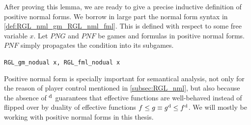 After proving this lemma, we are ready to give a precise inductive definition of positive normal forms. We borrow in large part the normal form syntax in \autoref{def:RGL_nml_gm_RGL_nml_fml}. This is defined with respect to some free variable $x$. Let $PNG$ and $PNF$ be \RGL{} games and formulas in positive normal forms. $PNF$ simply propagates the condition into its subgames.

\begin{bdefinition}
\label{def:RGL_nodual_gm_RGL_nodual_fml}
\texttt{RGL\_gm\_nodual x, RGL\_fml\_nodual x}

\end{bdefinition}

Positive normal form is specially important for semantical analysis, not only for the reason of player control mentioned in \autoref{subsec:RGL_nml}, but also because the absence of $^\text{d}$ guarantees that effective functions are well-behaved instead of flipped over by duality of effective functions $f\leq g \equiv g^\text{d} \leq f^\text{d}$. We will mostly be working with positive normal forms in this thesis.

